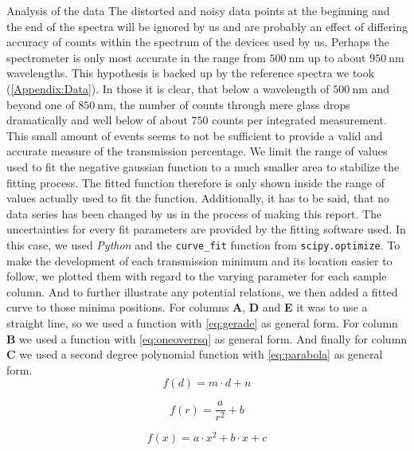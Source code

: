 \documentclass[pdftex, a4paper,11pt, twoside, UKenglish]{report}
\begin{document}
\begin{chapter}{Analysis of the data}
    The distorted and noisy data points at the beginning and the end of the
    spectra will be ignored by us and are probably an effect of differing
    accuracy of counts within the spectrum  of the devices used by us.
    Perhaps the spectrometer is only most accurate in the range from
    $\SI{500}{\nano\meter}$ up to about $\SI{950}{\nano\meter}$ wavelengths.
    This hypothesis is backed up by the reference spectra we took 
    (\cref{Appendix:Data}).
    In those it is clear, that below a wavelength of $\SI{500}{\nano\meter}$
    and beyond one of $\SI{850}{\nano\meter}$, the number of counts through
    mere glass drops dramatically and well below of about $750$ counts per
    integrated measurement. This small amount of events seems to not be
    sufficient to provide a valid and accurate measure of the transmission
    percentage.
    We limit the range of values used to fit the negative
    gaussian function to a much smaller area to stabilize the fitting process.
    The fitted function therefore is only shown inside the range of values
    actually used to fit the function. 
    Additionally, it has to be said, that no data series has been changed by us
    in the process of making this report. The uncertainties for every fit
    parameters are provided by the fitting software used.
    In this case, we used \textit{Python} and the \texttt{curve\_fit} function
    from \texttt{scipy.optimize}.
    To make the development of each transmission minimum and its location
    easier to follow, we plotted them with regard to the varying parameter for
    each sample column. And to further illustrate any potential relations, we
    then added a fitted curve to those minima positions.
    For columns \textbf{A}, \textbf{D} and \textbf{E} it was to use a
    straight line, so we used a function with \cref{eq:gerade} as general form.
    For column \textbf{B} we used a function with \cref{eq:oneoverrsq} as
    general form.
    And finally for column \textbf{C} we used a second degree polynomial
    function with \cref{eq:parabola} as general form.
    \begin{equation}
      \label{eq:gerade}
      f(d) = m\cdot d + n
    \end{equation}
    
    \begin{equation}
      \label{eq:oneoverrsq}
      f(r) = \frac{a}{r^{2}}+b
    \end{equation}
    
    \begin{equation}
      \label{eq:parabola}
      f(x) = a\cdot x^{2} + b\cdot x + c
    \end{equation}
    

\end{chapter}
\end{document}
